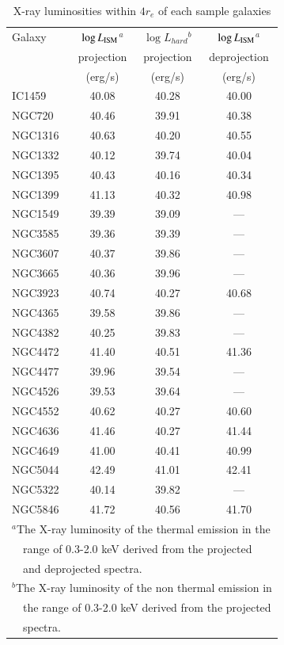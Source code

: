\documentclass[structabstract]{aa}
\begin{document}
\begin{table}
\caption{X-ray luminosities within $4r_e$ of each sample galaxies}
\label{tab:lx}
\centering
\begin{tabular}{lccc}
\hline \hline
Galaxy & $\log L_{{\rm ISM}}$$^a$ & $\log L_{hard}$$^b$ & $\log L_{{\rm ISM}}$$^a$  \\
 & projection & projection & deprojection \\
 & (erg/s) & (erg/s) & (erg/s) \\ \hline
IC1459  & 40.08 & 40.28 & 40.00 \\
NGC720  & 40.46 & 39.91 & 40.38 \\
NGC1316 & 40.63 & 40.20 & 40.55 \\
NGC1332 & 40.12 & 39.74 & 40.04 \\
NGC1395 & 40.43 & 40.16 & 40.34 \\
NGC1399 & 41.13 & 40.32 & 40.98 \\
NGC1549 & 39.39 & 39.09 & ---   \\
NGC3585 & 39.36 & 39.39 & ---   \\
NGC3607 & 40.37 & 39.86 & ---   \\
NGC3665 & 40.36 & 39.96 & ---   \\
NGC3923 & 40.74 & 40.27 & 40.68 \\
NGC4365 & 39.58 & 39.86 & ---   \\
NGC4382 & 40.25 & 39.83 & ---   \\
NGC4472 & 41.40 & 40.51 & 41.36 \\
NGC4477 & 39.96 & 39.54 & ---   \\
NGC4526 & 39.53 & 39.64 & ---   \\
NGC4552 & 40.62 & 40.27 & 40.60 \\
NGC4636 & 41.46 & 40.27 & 41.44 \\
NGC4649 & 41.00 & 40.41 & 40.99 \\
NGC5044 & 42.49 & 41.01 & 42.41 \\
NGC5322 & 40.14 & 39.82 & ---   \\
NGC5846 & 41.72 & 40.56 & 41.70 \\
\hline
\multicolumn{4}{l}{$^a$The X-ray luminosity of the thermal emission in the}\\
\multicolumn{4}{l}{~~range of 0.3-2.0 keV derived from the projected}\\
\multicolumn{4}{l}{~~and deprojected spectra.}\\
\multicolumn{4}{l}{$^b$The X-ray luminosity of the non thermal emission in}\\
\multicolumn{4}{l}{~~the range of 0.3-2.0 keV derived from the projected}\\
\multicolumn{4}{l}{~~spectra.}\\
\end{tabular}
\end{table}
\end{document}
